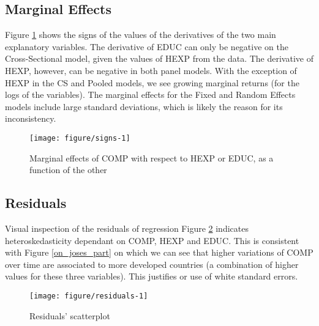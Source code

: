 \documentclass[12pt,a4paper]{article}\usepackage[]{graphicx}\usepackage[]{color}
\makeatletter
\def\maxwidth{ %
  \ifdim\Gin@nat@width>\linewidth
    \linewidth
  \else
    \Gin@nat@width
  \fi
}
\newenvironment{knitrout}{}{} %
\makeatother
\begin{document}
\subsection{Marginal Effects}
Figure \ref{fig:signs} shows the signs of the values of the derivatives of the two main explanatory variables. The derivative of EDUC can only be negative on the Cross-Sectional model, given the values of HEXP from the data. The derivative of HEXP, however, can be negative in both panel models. With the exception of HEXP in the CS and Pooled models, we see growing marginal returns (for the logs of the variables). The marginal effects for the Fixed and Random Effects models include large standard deviations, which is likely the reason for its inconsistency.
\begin{knitrout}
\color{fgcolor}\begin{figure}
\texttt{[image: figure/signs-1]} \caption[Marginal effects of COMP with respect to HEXP or EDUC, as a function of the other]{Marginal effects of COMP with respect to HEXP or EDUC, as a function of the other}\label{fig:signs}
\end{figure}


\end{knitrout}
\subsection{Residuals}
Visual inspection of the residuals of regression Figure \ref{fig:residuals} indicates heteroskedasticity dependant on COMP, HEXP and EDUC. This is consistent with Figure \ref{on_joses_part} on which we can see that higher variations of COMP over time are associated to more developed countries (a combination of higher values for these three variables). This justifies or use of white standard errors.
\begin{knitrout}
\color{fgcolor}\begin{figure}[!htbp]

{\centering \texttt{[image: figure/residuals-1]} 

}

\caption[Residuals' scatterplot]{Residuals' scatterplot}\label{fig:residuals}
\end{figure}


\end{knitrout}
\end{document}
